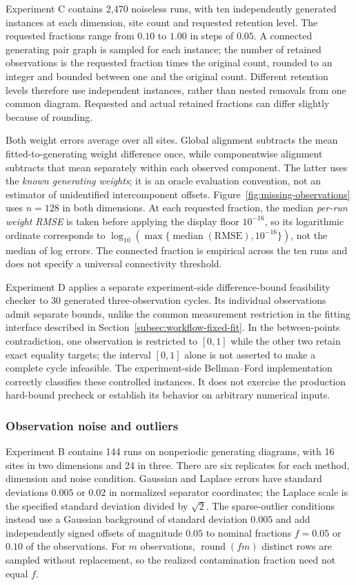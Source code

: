 Experiment C contains 2,470 noiseless runs, with ten independently generated
instances at each dimension, site count and requested retention level. The
requested fractions range from $0.10$ to $1.00$ in steps of $0.05$. A connected
generating pair graph is sampled for each instance; the number of retained
observations is the requested fraction times the original count, rounded to
an integer and bounded between one and the original count. Different
retention levels therefore use independent instances, rather than nested
removals from one common diagram. Requested and actual retained fractions
can differ slightly because of rounding.

Both weight errors average over all sites. Global alignment subtracts the
mean fitted-to-generating weight difference once, while componentwise
alignment subtracts that mean separately within each observed component.
The latter uses the \emph{known generating weights}; it is an oracle
evaluation convention, not an estimator of unidentified intercomponent
offsets. Figure~\ref{fig:missing-observations} uses $n=128$ in both dimensions.
At each requested fraction, the median \emph{per-run weight RMSE} is taken
before applying the display floor $10^{-16}$, so its logarithmic ordinate
corresponds to
$\log_{10}(\max\{\operatorname{median}(\mathrm{RMSE}),10^{-16}\})$,
not the median of log errors. The connected fraction is empirical across
the ten runs and does not specify a universal connectivity threshold.

Experiment D applies a separate experiment-side difference-bound feasibility
checker to 30 generated three-observation cycles. Its individual observations
admit separate bounds, unlike the common measurement restriction in the
fitting interface described in Section~\ref{subsec:workflow-fixed-fit}.
In the between-points contradiction, one observation is restricted to
$[0,1]$ while the other two retain exact equality targets; the interval
$[0,1]$ alone is not asserted to make a complete cycle infeasible. The
experiment-side Bellman--Ford implementation correctly classifies these
controlled instances. It does not exercise the production hard-bound precheck
or establish its behavior on arbitrary numerical inputs.

\subsubsection{Observation noise and outliers}
\label{app:synthetic-noise}

Experiment B contains 144 runs on nonperiodic generating diagrams, with
16 sites in two dimensions and 24 in three. There are six replicates for
each method, dimension and noise condition. Gaussian and Laplace errors have
standard deviations $0.005$ or $0.02$ in normalized separator coordinates;
the Laplace scale is the specified standard deviation divided by $\sqrt2$.
The sparse-outlier conditions instead use a Gaussian background of standard
deviation $0.005$ and add independently signed offsets of magnitude $0.05$
to nominal fractions $f=0.05$ or $0.10$ of the observations. For $m$
observations, $\operatorname{round}(fm)$ distinct rows are sampled without
replacement, so the realized contamination fraction need not equal $f$.


